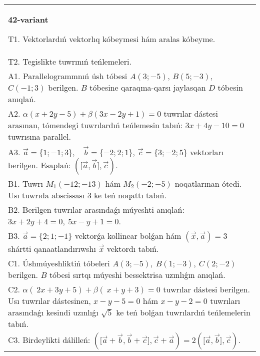 \documentclass{article}
\begin{document}
\begin{tabular}{m{17cm}}
\textbf{42-variant}
\newline

T1. 
Vektorlardıń vektorlıq kóbeymesi hám aralas kóbeyme.
 \\
T2. 
Tegislikte tuwrınıń teńlemeleri.
 \\
A1. 
Parallelogrammnıń úsh tóbesi
$A(3;-5)$, $B(5;-3)$, $C(-1;3)$ berilgen. $B$ tóbesine
qaraqma-qarsı jaylasqan $D$ tóbesin anıqlań.
 \\
A2. 
$\alpha(x+2y-5)+\beta(3x-2y+1)=0$ tuwrılar
dástesi arasınan, tómendegi tuwrılardıń teńlemesin tabıń:
$3x+4y-10=0$ tuwrısına parallel.
 \\
A3. 
$\overrightarrow{a}
= \{ 1; - 1;3\}, \ \ \ \ \overrightarrow{b} = \{ - 2;2;1\}$, $\overrightarrow{c} = \{3; -2;5\}$ vektorları berilgen. Esaplań: 
$(\lbrack\overrightarrow{a},\overrightarrow{b}\rbrack,\overrightarrow{c})$.
 \\
B1. 
Tuwrı \(M_{1}(-12;-13)\) hám \(M_{2}(-2;-5)\)
noqatlarınan ótedi. Usı tuwrıda abscissası 3 ke teń noqattı tabıń.
 \\
B2. 
Berilgen tuwrılar arasındaǵı múyeshti anıqlań: $3x+2y+4=0,\ 5x-y+1=0$.
 \\
B3. 
$\vec{a} = \{ 2;1; - 1\}$ vektorǵa kollinear bolǵan hám $\left(\vec{x},\vec{a} \right) = 3$ shártti qanaatlandırıwshı $\vec{x}$ vektordı tabıń.
 \\
C1. 
Úshmúyeshliktiń tóbeleri
\(A(3; - 5),\ B(1; - 3),\ C(2; - 2)\) berilgen. $B$ tóbesi sırtqı
múyeshi bessektrisa uzınlıǵın anıqlań.
 \\
C2. 
\(\alpha (\ 2x + 3y + 5) + \beta(\ x + y + 3) = 0\) 
tuwrılar dástesi berilgen. Usı tuwrılar dástesinen,
\(x - y - 5 = 0\) hám \(x - y - 2 = 0\) tuwrıları arasındaǵı
kesindi uzınlıǵı \(\sqrt{5}\) ke teń bolǵan tuwrılardıń teńlemelerin
tabıń.
 \\
C3. 
Birdeylikti dálilleń: \((\lbrack\vec{a} + \vec{b},\vec{b} + \vec{c}\rbrack,\vec{c} + \vec{a}) = 2 (\lbrack\vec{a},\vec{b}\rbrack,\vec{c}) \).
 \\

\end{tabular}
\vspace{1cm}
\end{document}
